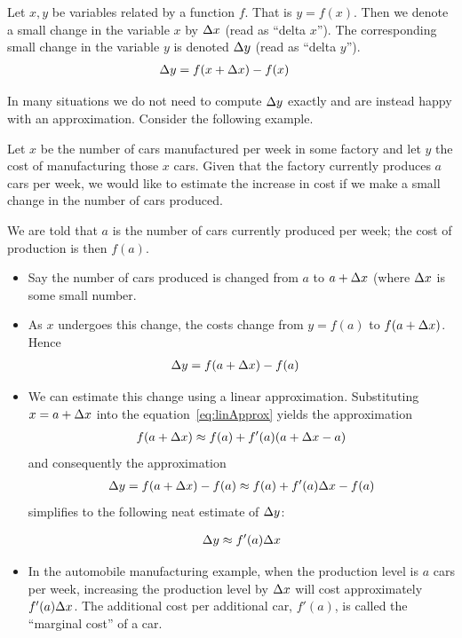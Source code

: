 \begin{notn}
 Let $x,y$ be variables related by a function $f$. That is $y = f(x)$. Then we denote a
  small change in the variable $x$ by $\Delta x$ (read as ``delta $x$''). The corresponding
small change in the variable $y$ is denoted $\Delta y$ (read as ``delta $y$'').
\begin{align*}
  \Delta y &= f(x+\Delta x) - f(x)
\end{align*}
\end{notn}

In many situations we do not need to compute $\Delta y$ exactly and are instead happy with
an approximation. Consider the following example.
\begin{eg}
Let $x$ be the number of cars manufactured per week in some factory and let $y$ the cost
of manufacturing those $x$ cars. Given that the factory currently produces $a$ cars per
week, we would like to estimate the increase in cost if we make a small change in the
number of cars produced.

\soln We are told that $a$ is the number of cars currently produced per week; the cost
of production  is then $f(a)$.
\begin{itemize}
 \item Say the number of cars produced is changed from $a$ to $a+\Delta x$ (where $\Delta x$
is some small number.
\item As $x$ undergoes this change, the costs change from $y=f(a)$ to $f(a+\Delta x)$.
Hence
\begin{align*}
  \Delta y &= f(a+\Delta x) - f(a)
\end{align*}
\item We can estimate this change using a linear approximation. Substituting
$x=a+\Delta x$ into the equation~\eqref{eq:linApprox} yields the approximation
\begin{align*}
f(a+\Delta x)\approx f(a)+f'(a)(a+\Delta x-a)
\end{align*}
and consequently the approximation
\begin{align*}
\Delta y=f(a+\Delta x)-f(a)\approx f(a)+f'(a)\Delta x-f(a)
\end{align*}
simplifies to the following neat estimate of $\Delta y$:
\begin{impeqn}\label{eq:lineDe}
\begin{align*}
    \Delta y\approx f'(a)\Delta x
\end{align*}
\end{impeqn}
\item In the automobile manufacturing example, when the production level is $a$ cars per
week, increasing the production level by $\Delta x$ will cost approximately
$f'(a)\Delta x$. The additional cost per additional car, $f'(a)$,  is called the ``marginal
cost'' of a car.


\end{itemize}
\end{eg}

